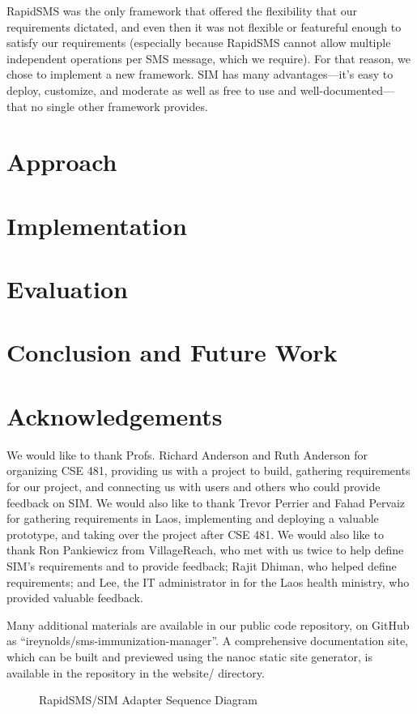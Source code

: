\documentclass{acm_proc_article-sp}
\begin{document}
RapidSMS was the only framework that offered the flexibility that our requirements dictated, and even then it was not flexible or featureful enough to satisfy our requirements (especially because RapidSMS cannot allow multiple independent operations per SMS message, which we require). For that reason, we chose to implement a new framework. SIM has many advantages---it's easy to deploy, customize, and moderate as well as free to use and well-documented---that no single other framework provides.

\section{Approach}

\section{Implementation}

\section{Evaluation}

\section{Conclusion and Future Work}

\section{Acknowledgements}

We would like to thank Profs. Richard Anderson and Ruth Anderson for organizing CSE 481, providing us with a project to build, gathering requirements for our project, and connecting us with users and others who could provide feedback on SIM. We would also like to thank Trevor Perrier and Fahad Pervaiz for gathering requirements in Laos, implementing and deploying a valuable prototype, and taking over the project after CSE 481. We would also like to thank Ron Pankiewicz from VillageReach, who met with us twice to help define SIM's requirements and to provide feedback; Rajit Dhiman, who helped define requirements; and Lee, the IT administrator in for the Laos health ministry, who provided valuable feedback.


  
\balancecolumns

\appendix
Many additional materials are available in our public code repository, on GitHub as ``ireynolds/sms-immunization-manager''. A comprehensive documentation site, which can be built and previewed using the nanoc static site generator, is available in the repository in the website/ directory.

\begin{figure*}
\centering
{}
\caption{RapidSMS/SIM Adapter Sequence Diagram}
\end{figure*}
\end{document}
